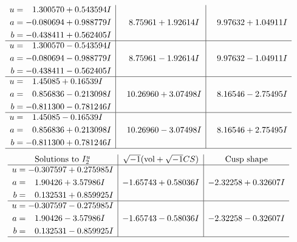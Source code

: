 \documentclass[1p]{elsarticle_modified}
\theoremstyle{definition}
\newcommand{\I}{\sqrt{-1}}
\begin{document}
$$\begin{array}{c|c|c}
\begin{aligned}
u &= \phantom{-}1.300570 + 0.543594 I \\
a &= -0.080694 + 0.988779 I \\
b &= -0.438411 + 0.562405 I\end{aligned}
 & \phantom{-}8.75961 + 1.92614 I & \phantom{-}9.97632 + 1.04911 I \\ \hline\begin{aligned}
u &= \phantom{-}1.300570 - 0.543594 I \\
a &= -0.080694 - 0.988779 I \\
b &= -0.438411 - 0.562405 I\end{aligned}
 & \phantom{-}8.75961 - 1.92614 I & \phantom{-}9.97632 - 1.04911 I \\ \hline\begin{aligned}
u &= \phantom{-}1.45085 + 0.16539 I \\
a &= \phantom{-}0.856836 - 0.213098 I \\
b &= -0.811300 - 0.781246 I\end{aligned}
 & \phantom{-}10.26960 + 3.07498 I & \phantom{-}8.16546 - 2.75495 I \\ \hline\begin{aligned}
u &= \phantom{-}1.45085 - 0.16539 I \\
a &= \phantom{-}0.856836 + 0.213098 I \\
b &= -0.811300 + 0.781246 I\end{aligned}
 & \phantom{-}10.26960 - 3.07498 I & \phantom{-}8.16546 + 2.75495 I\\
 \hline 
 \end{array}$$\newpage$$\begin{array}{c|c|c}  
\text{Solutions to }I^u_{2}& \I (\text{vol} + \sqrt{-1}CS) & \text{Cusp shape}\\
 \hline 
\begin{aligned}
u &= -0.307597 + 0.275985 I \\
a &= \phantom{-}1.90426 + 3.57986 I \\
b &= \phantom{-}0.132531 + 0.859925 I\end{aligned}
 & -1.65743 + 0.58036 I & -2.32258 + 0.32607 I \\ \hline\begin{aligned}
u &= -0.307597 - 0.275985 I \\
a &= \phantom{-}1.90426 - 3.57986 I \\
b &= \phantom{-}0.132531 - 0.859925 I\end{aligned}
 & -1.65743 - 0.58036 I & -2.32258 - 0.32607 I\\
 \hline 
 \end{array}$$\newpage
\end{document}
